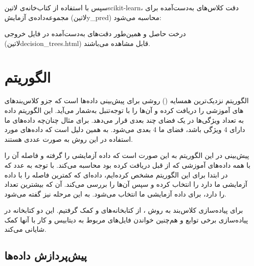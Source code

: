 \documentclass[a4paper,12pt]{article}
\begin{document}
سپس با استفاده از کتاب‌خانه‌ی ‌لاتین{scikit-learn}، دقت کلاس‌های به‌دست‌آمده برای مجموعه‌داده‌ی آزمایش (‌لاتین{y\_pred}) محاسبه می‌شود:
\begin{flushleft}
\end{flushleft}

درخت حاصل و همین‌طور دقت‌های به‌دست‌آمده در فایل خروجی (‌لاتین{decision\_trees.html}) قابل مشاهده می‌باشند.
	
	
	
	
\section{الگوریتم }
\paragraph{}
الگوریتم  نزدیک‌ترین همسایه () روشی برای پیش‌بینی  داده‌ها است که جزو کلاس‌بندهای تنبل به‌شمار می‌آید. این الگوریتم داده‌‎های آموزشی را دریافت کرده و آن‌ها را با توجه به تعداد ویژگی‌ها در یک فضای چند بعدی قرار می‌دهد. برای مثال چنان‌چه داد‌ه‌های ما دارای 4 ویژگی باشد، فضای ما 4 بعدی می‌شود. به همین دلیل است که داده‌های مورد استفاده در این روش به صورت عددی هستند.

پیش‌بینی در این الگوریتم به این صورت است که داده آزمایشی را گرفته و فاصله آن را با همه داده‌های آموزشی که از قبل دریافت کرده بود محاسبه می‌کند. با توجه به عدد  که در ابتدا برای این الگوریتم مشخص کرده‌ایم،  داده‌ای که کمترین فاصله را با داده آزمایشی ما دارد را انتخاب کرده و سپس  آن‌ها را بررسی می‌کند. آن  که بیشترین تعداد را دارد، برای  داده آزمایشی ما انتخاب می‌شود. به این مرحله  نیز گفته می‌شود.

برای پیاده‌سازی کلاس‌بند به روش ، از کتابخانه‌های  و  کمک گرفتیم. این دو کتابخانه در پیاده‌سازی برخی توابع و هم‌چنین خواندن فایل‌های مربوط به دیتابیس و کار با آنها کمک شایانی می‌کند.

\subsection{پیش‌پردازش داده‌ها}
\end{document}
